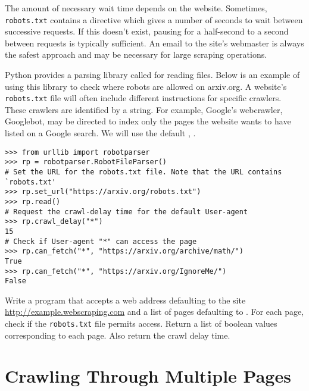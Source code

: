 The amount of necessary wait time depends on the website.
Sometimes, \texttt{robots.txt} contains a  directive which gives a number of seconds to wait between successive requests.
If this doesn't exist, pausing for a half-second to a second between requests is typically sufficient.
An email to the site's webmaster is always the safest approach and may be necessary for large scraping operations.

Python provides a parsing library called  for reading  files.
Below is an example of using this library to check where robots are allowed on arxiv.org.
A website's \texttt{robots.txt} file will often include different instructions for specific crawlers.
These crawlers are identified by a  string.
For example, Google's webcrawler,  Googlebot, may be directed to index only the pages the website wants to have listed on a Google search.
We will use the default , .

\begin{lstlisting}
>>> from urllib import robotparser
>>> rp = robotparser.RobotFileParser()
# Set the URL for the robots.txt file. Note that the URL contains `robots.txt'
>>> rp.set_url("https://arxiv.org/robots.txt") 
>>> rp.read()
# Request the crawl-delay time for the default User-agent
>>> rp.crawl_delay("*")	
15
# Check if User-agent "*" can access the page
>>> rp.can_fetch("*", "https://arxiv.org/archive/math/") 
True
>>> rp.can_fetch("*", "https://arxiv.org/IgnoreMe/")
False
\end{lstlisting}

\begin{problem} %
Write a program that accepts a web address defaulting to the site \url{http://example.webscraping.com} and a list of pages defaulting to .
For each page, check if the \texttt{robots.txt} file permits access.
Return a list of boolean values corresponding to each page.
Also return the crawl delay time.
\label{problem:robots-file}
\end{problem}

\section*{Crawling Through Multiple Pages} %

